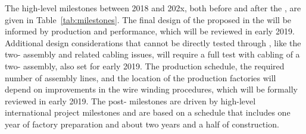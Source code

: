 

The high-level milestones between 2018 and 202x, both before and after the , are given in Table~\ref{tab:milestones}. The final design of the  proposed in the  will be informed by   production and performance, which will be reviewed in early 2019. Additional design considerations that cannot be directly tested through , like the two- assembly and related cabling issues, will require a full test with cabling of a two- assembly, also set for early 2019. The production schedule, the required number of assembly lines, and the location of the production factories will depend on improvements in the wire winding procedures, which will be formally reviewed in early 2019. The post- milestones are driven by high-level international project milestones and are based on a schedule that includes one year of factory preparation and about two years and a half of  construction.

